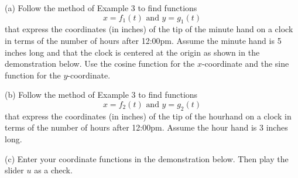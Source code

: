 \documentclass{ximera}
\begin{document}
\begin{question} \label{Qgpnd0:Motion}
(a) Follow the method of Example 3 to find functions
\[
   x = f_1(t) \text{ and } y=g_1(t)
\]
that express the coordinates (in inches) of the tip of the minute hand on a clock in terms of the number of hours after 12:00pm. Assume the minute hand is 5 inches long and that the clock is centered at the origin as shown in the demonstration below. Use the cosine function for the $x$-coordinate and the sine function for the $y$-coordinate.

(b) Follow the method of Example 3 to find functions
\[
   x = f_2(t) \text{ and } y=g_2(t)
\]
that express the coordinates (in inches) of the tip of the hourhand on a clock in terms of the number of hours after 12:00pm. Assume the hour hand is 3 inches long.

(c) Enter your coordinate functions in the demonstration below. Then play the slider $u$ as a check.


 
\begin{onlineOnly}
    \begin{center}
\end{center}
\end{onlineOnly}


\end{question}
\end{document}

